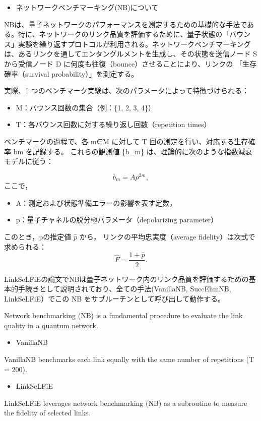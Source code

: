 \documentclass[twocolumn,a4paper,dvipdfmx]{ieicejsp}
\begin{document}
\begin{itemize}
\item ネットワークベンチマーキング(NB)について
\end{itemize}
NBは、量子ネットワークのパフォーマンスを測定するための基礎的な手法であ
る。特に、ネットワークのリンク品質を評価するために、量子状態の「バウン
ス」実験を繰り返すプロトコルが利用される。ネットワークベンチマーキング
は、あるリンクを通してエンタングルメントを生成し、その状態を送信ノード
S から受信ノード D に何度も往復（bounce）させることにより、リンクの
「生存確率（survival probability）」を測定する。

実際、1 つのベンチマーク実験は、次のパラメータによって特徴づけられる：
\begin{itemize}
\item M：バウンス回数の集合（例：\{1, 2, 3, 4\}）
\item T：各バウンス回数に対する繰り返し回数（repetition times）
\end{itemize}
ベンチマークの過程で、各 m∈M に対して T 回の測定を行い、対応する生存確
率 bm を記録する。
これらの観測値 \{b\_m\} は、理論的に次のような指数減衰モデルに従う：


\[
b_m = A p^{2m},
\]
ここで，

\begin{itemize}
\item A：測定および状態準備エラーの影響を表す定数，
\item p：量子チャネルの脱分極パラメータ（depolarizing parameter）
\end{itemize}


このとき，pの推定値 \(\hat{p}\) から，
リンクの平均忠実度（average fidelity）は次式で求められる：
\[
\hat{F} = \frac{1 + \hat{p}}{2}.
\]

LinkSeLFiEの論文でNBは量子ネットワーク内のリンク品質を評価するための基
本的手続きとして説明されており、全ての手法(VanillaNB, SuccElimNB,
LinkSeLFiE）でこの NB をサブルーチンとして呼び出して動作する。

Network benchmarking (NB) is a fundamental procedure to evaluate the link quality in a quantum network.

\begin{itemize}
\item VanillaNB
\end{itemize}
VanillaNB benchmarks each link equally with the same number of repetitions (T = 200).
\begin{itemize}
\item LinkSeLFiE
\end{itemize}
LinkSeLFiE leverages network benchmarking (NB) as a subroutine to measure the fidelity of selected links.
\end{document}

